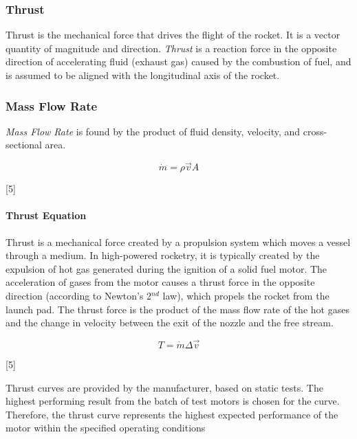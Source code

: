 \documentclass[]{article}
\let\oldparagraph\paragraph
\renewcommand{\paragraph}[1]{\oldparagraph{#1}\mbox{}}
\begin{document}
\subsubsection{Thrust}\label{thrust}

Thrust is the mechanical force that drives the flight of the rocket. It
is a vector quantity of magnitude and direction. \emph{Thrust} is a
reaction force in the opposite direction of accelerating fluid (exhaust
gas) caused by the combustion of fuel, and is assumed to be aligned with
the longitudinal axis of the rocket.

\subsubsection{Mass Flow Rate}\label{mass-flow-rate}

\emph{Mass Flow Rate} is found by the product of fluid density,
velocity, and cross-sectional area.

\begin{equation} 
\dot{m} = \rho \vec{v} A
\end{equation}

{[}5{]}

\paragraph{Thrust Equation}\label{thrust-equation}

Thrust is a mechanical force created by a propulsion system which moves
a vessel through a medium. In high-powered rocketry, it is typically
created by the expulsion of hot gas generated during the ignition of a
solid fuel motor. The acceleration of gases from the motor causes a
thrust force in the opposite direction (according to Newton's 2\(^{nd}\)
law), which propels the rocket from the launch pad. The thrust force is
the product of the mass flow rate of the hot gases and the change in
velocity between the exit of the nozzle and the free stream.

\begin{equation} 
T = \dot{m} \Delta \vec{v} 
\end{equation}

{[}5{]}

Thrust curves are provided by the manufacturer, based on static tests.
The highest performing result from the batch of test motors is chosen
for the curve. Therefore, the thrust curve represents the highest
expected performance of the motor within the specified operating
conditions
\end{document}
